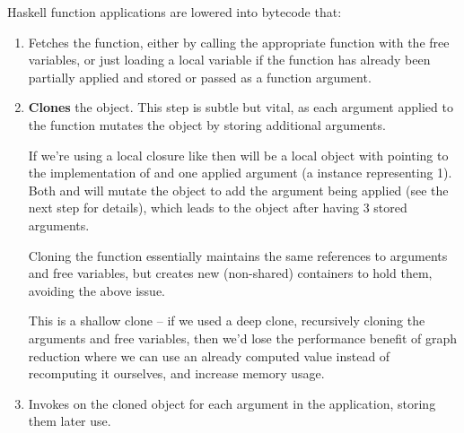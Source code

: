 \documentclass[dissertation.tex]{subfiles}
\begin{document}
{{{{                Haskell function applications are lowered into bytecode that:
                \begin{enumerate}
                \item
                {

                    Fetches the function, either by calling the appropriate  function with the free
                    variables, or just loading a local variable if the function has already been partially applied and
                    stored or passed as a function argument.

                }
                \item
                {

                    \textbf{Clones} the  object. This step is subtle but vital, as each argument applied
                    to the function mutates the  object by storing additional arguments.
                    
                    If we're using a local closure like  then
                     will be a local  object with  pointing to the
                    implementation of \haskell{(+)} and one applied argument (a  instance representing 1).
                    Both  and  will mutate the object to add the argument being applied
                    (see the next step for details), which leads to the  object after 
                    having 3 stored arguments.

                    Cloning the function essentially maintains the same references to arguments and free variables, but
                    creates new (non-shared) containers to hold them, avoiding the above issue.
                    
                    This is a shallow clone -- if we used a deep clone, recursively cloning the arguments and free
                    variables, then we'd lose the performance benefit of graph reduction where we can use an already
                    computed value instead of recomputing it ourselves, and increase memory usage.

                }
                \item
                {

                    Invokes  on the cloned object for each argument in the application, storing them
                    later use.

}
\end{enumerate}}}}}
\end{document}
